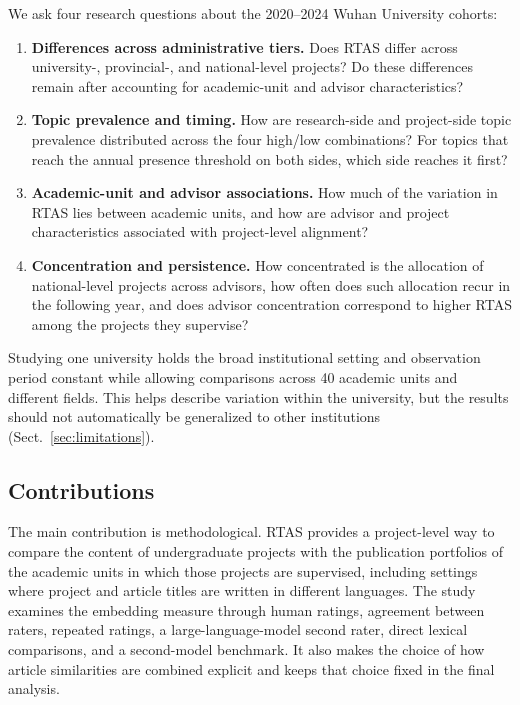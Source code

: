 \documentclass[pdflatex,sn-apa]{sn-jnl}
\begin{document}
We ask four research questions about the 2020--2024 Wuhan University cohorts:

\begin{enumerate}
\item[\textbf{RQ1.}] \textbf{Differences across administrative tiers.} Does RTAS differ across university-, provincial-, and national-level projects? Do these differences remain after accounting for academic-unit and advisor characteristics?
\item[\textbf{RQ2.}] \textbf{Topic prevalence and timing.} How are research-side and project-side topic prevalence distributed across the four high/low combinations? For topics that reach the annual presence threshold on both sides, which side reaches it first?
\item[\textbf{RQ3.}] \textbf{Academic-unit and advisor associations.} How much of the variation in RTAS lies between academic units, and how are advisor and project characteristics associated with project-level alignment?
\item[\textbf{RQ4.}] \textbf{Concentration and persistence.} How concentrated is the allocation of national-level projects across advisors, how often does such allocation recur in the following year, and does advisor concentration correspond to higher RTAS among the projects they supervise?
\end{enumerate}

Studying one university holds the broad institutional setting and observation period constant while allowing comparisons across 40 academic units and different fields. This helps describe variation within the university, but the results should not automatically be generalized to other institutions (Sect.~\ref{sec:limitations}).

\subsection{Contributions}

The main contribution is methodological. RTAS provides a project-level way to compare the content of undergraduate projects with the publication portfolios of the academic units in which those projects are supervised, including settings where project and article titles are written in different languages. The study examines the embedding measure through human ratings, agreement between raters, repeated ratings, a large-language-model second rater, direct lexical comparisons, and a second-model benchmark. It also makes the choice of how article similarities are combined explicit and keeps that choice fixed in the final analysis.
\end{document}
